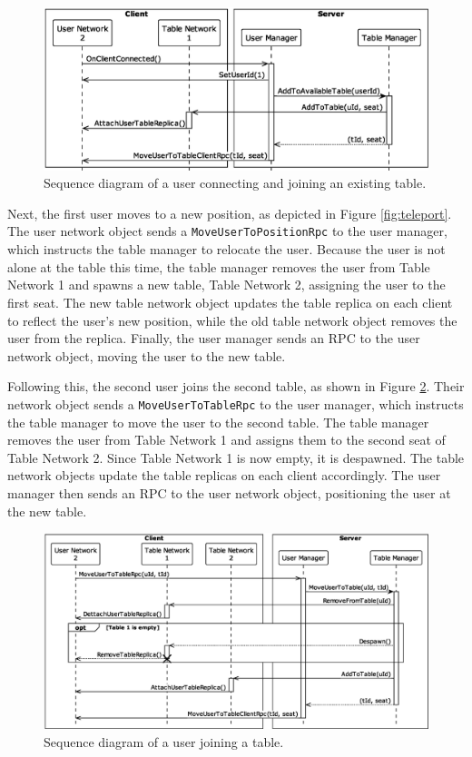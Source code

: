         \begin{figure}[h]
            \centering
            \includegraphics[width=.85\linewidth]{diagrams/out/connect_and_join_existing_table.eps}
            \caption{Sequence diagram of a user connecting and joining an existing table.}
            \label{fig:connect_and_join}
        \end{figure}

        Next, the first user moves to a new position, as depicted in Figure \ref{fig:teleport}. The user network object sends a \lstinline{MoveUserToPositionRpc} to the user manager, which instructs the table manager to relocate the user. Because the user is not alone at the table this time, the table manager removes the user from Table Network 1 and spawns a new table, Table Network 2, assigning the user to the first seat. The new table network object updates the table replica on each client to reflect the user's new position, while the old table network object removes the user from the replica. Finally, the user manager sends an RPC to the user network object, moving the user to the new table.

        Following this, the second user joins the second table, as shown in Figure \ref{fig:table_join}. Their network object sends a \lstinline{MoveUserToTableRpc} to the user manager, which instructs the table manager to move the user to the second table. The table manager removes the user from Table Network 1 and assigns them to the second seat of Table Network 2. Since Table Network 1 is now empty, it is despawned. The table network objects update the table replicas on each client accordingly. The user manager then sends an RPC to the user network object, positioning the user at the new table.
        
        \begin{figure}[h]
            \centering
            \includegraphics[width=.85\linewidth]{diagrams/out/table_join.eps}
            \caption{Sequence diagram of a user joining a table.}
            \label{fig:table_join}
        \end{figure}


